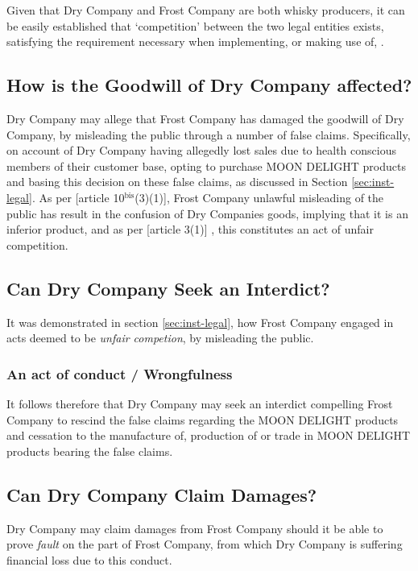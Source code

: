 \documentclass[11pt]{article}
\begin{document}
Given that Dry Company and Frost Company are both whisky producers, it can be
easily established that `competition' between the two legal entities exists,
satisfying the requirement necessary when implementing, or making use of,
\cite{wipo83_paris_conve_protect_ip}.

\subsection{How is the Goodwill of Dry Company affected?}
\label{sec:orga97e195}
\label{sec:goodwill}
Dry Company may allege that Frost Company has damaged the goodwill of Dry
Company, by misleading the public through a number of false claims. Specifically, on account of Dry Company having allegedly
lost sales due to health conscious members of their customer base, opting to
purchase MOON DELIGHT products and basing this decision on these false claims,
as discussed in Section \ref{sec:inst-legal}. As per [article
10\(^{\text{bis}}\)(3)(1)]\cite{wipo83_paris_conve_protect_ip}, Frost Company unlawful
misleading of the public has result in the confusion of Dry Companies goods,
implying that it is an inferior product, and as per [article 3(1)]
\cite{wipo96_model_provi_unfair_comp}, this constitutes an act of unfair
competition.

\subsection{Can Dry Company Seek an Interdict?}
\label{sec:org82bb85c}
\label{sec:interdict}
It was demonstrated in section \ref{sec:inst-legal}, how Frost Company engaged in
acts deemed to be \emph{unfair competion}, by
misleading the public.

\subsubsection{An act of conduct / Wrongfulness}
\label{sec:org3da4fc4}
It follows therefore that Dry Company may seek an interdict compelling
Frost Company to rescind the false claims regarding the MOON DELIGHT products
and cessation to the manufacture of, production of or trade in MOON DELIGHT
products bearing the false claims.

\subsection{Can Dry Company Claim Damages?}
\label{sec:org6cf6b28}

Dry Company may claim damages from Frost Company should it be able to prove
\emph{fault} on the part of Frost Company, from which Dry Company is suffering
financial loss due to this conduct.
\end{document}
